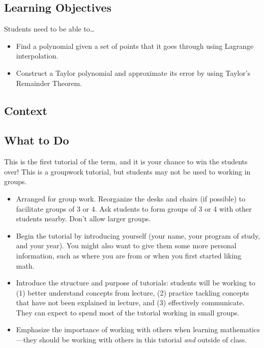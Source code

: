 		\subsection*{Learning Objectives} Students need to be able to\ldots
		\begin{itemize}
			\item Find a polynomial given a set of points that it goes through using Lagrange interpolation.
			\item Construct a Taylor polynomial and approximate its error by using Taylor's Remainder Theorem.
		\end{itemize}

		\subsection*{Context} 


		\subsection*{What to Do} This is the first tutorial of the term, and
		it is your chance to win the students over! This is a groupwork tutorial,
		but students may not be used to working in groups.

		\begin{itemize}
			\item Arranged for group work. Reorganize the desks and chairs
				(if possible) to facilitate groups of 3 or 4. Ask
				students to form groups of 3 or 4 with other students
				nearby. Don't allow larger groups.

			\item Begin the tutorial by introducing yourself (your name,
				your program of study, and your year). You might
				also want to give them some more personal information,
				such as where you are from or when you first started liking math.

			\item Introduce the structure and purpose of tutorials: students
				will be working to (1) better understand concepts
				from lecture, (2) practice tackling concepts that
				have not been explained in lecture, and (3) effectively
				communicate. They can expect to spend most of the
				tutorial working in small groups.

			\item Emphasize the importance of working with others when
				learning mathematics---they should be working with
				others in this tutorial \emph{and} outside of
				class.
		\end{itemize}

